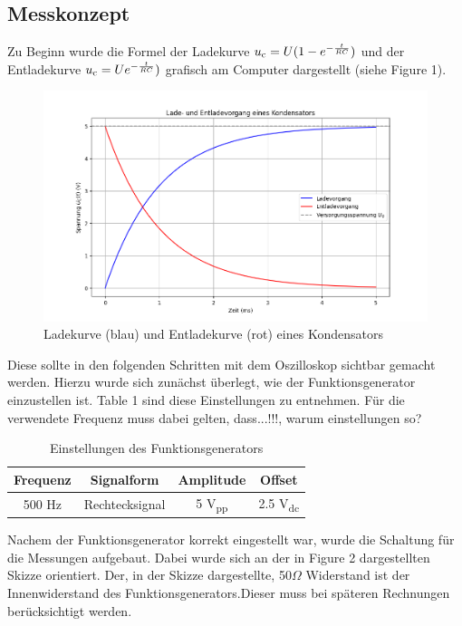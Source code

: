 \documentclass[a4paper,12pt]{article}
\begin{document}
\subsection{Messkonzept}
Zu Beginn wurde die Formel der Ladekurve \( u\textsubscript{c} = U (1 -e ^{-\frac{t}{RC}}) \) und der Entladekurve  \( u\textsubscript{c} = Ue ^{-\frac{t}{RC}}) \) grafisch am Computer dargestellt (siehe Figure 1). 

\begin{figure}[H]
    \centering
    \includegraphics[width=1.0\textwidth]{../Quellen/Labor2/Lade-EntladefunktionSkizze.png}
\caption{Ladekurve (blau) und Entladekurve (rot) eines Kondensators}
\end{figure}

\noindent Diese sollte in den folgenden Schritten mit dem Oszilloskop sichtbar gemacht werden. Hierzu wurde sich zunächst überlegt, wie der Funktionsgenerator einzustellen ist. Table 1 sind diese Einstellungen zu entnehmen. Für die verwendete Frequenz muss dabei gelten, dass...!!!, warum einstellungen so?

\begin{table}[H]
	\centering
	\begin{tabular}{|c|c|c|c|}
		\hline
		\textbf{Frequenz} & \textbf{Signalform} & \textbf{Amplitude} & \textbf{Offset}\\
		\hline
		500 Hz & Rechtecksignal & 5 V\textsubscript{pp} & 2.5 V\textsubscript{dc}\\
		\hline
	\end{tabular}
	\caption{Einstellungen des Funktionsgenerators}
\end{table}

\noindent Nachem der Funktionsgenerator korrekt eingestellt war, wurde die Schaltung  für die Messungen aufgebaut. Dabei wurde sich an der in Figure 2 dargestellten Skizze orientiert. Der, in der Skizze dargestellte, 50$\Omega$ Widerstand ist der Innenwiderstand des Funktionsgenerators.Dieser muss bei späteren Rechnungen berücksichtigt werden.\\
\end{document}

